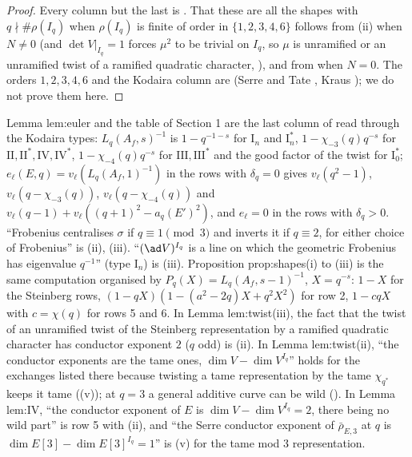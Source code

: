 \begin{proof}
Every column but the last is . That these are all the shapes with $q\nmid\#\rho(I_q)$
when $\rho(I_q)$ is finite of order in $\{1,2,3,4,6\}$ follows from (ii) when $N\ne0$ (and $\det V|_{I_q}=1$ forces $\mu^2$ to be trivial on
$I_q$, so $\mu$ is unramified or an unramified twist of a ramified quadratic character, ), and from  when $N=0$. The orders $1,2,3,4,6$ and the Kodaira column are
 (Serre and Tate \cite{SerreTate68}, Kraus \cite{Kraus90}); we do not prove them here.
\end{proof}

\begin{paperlink}\label{pl:local:euler}
Lemma lem:euler and the table of Section 1 are the last column of  read through the Kodaira types: $L_q(A_f,s)^{-1}$ is $1-q^{-1-s}$ for
$\mathrm{I}_n$ and $\mathrm{I}_n^*$, $1-\chi_{-3}(q)q^{-s}$ for $\mathrm{II},\mathrm{II}^*,\mathrm{IV},\mathrm{IV}^*$, $1-\chi_{-4}(q)q^{-s}$ for $\mathrm{III},\mathrm{III}^*$ and the good
factor of the twist for $\mathrm{I}_0^*$; $e_\ell(E,q)=v_\ell(L_q(A_f,1)^{-1})$ in the rows with $\delta_q=0$ gives $v_\ell(q^2-1)$, $v_\ell(q-\chi_{-3}(q))$, $v_\ell(q-\chi_{-4}(q))$ and
$v_\ell(q-1)+v_\ell((q+1)^2-a_q(E')^2)$, and $e_\ell=0$ in the rows with $\delta_q>0$. ``Frobenius centralises $\sigma$ if $q\equiv1\pmod3$ and inverts it if $q\equiv2$, for
either choice of Frobenius'' is (ii), (iii). ``$(\ad V)^{I_q}$ is a line on which the geometric Frobenius has eigenvalue $q^{-1}$''
(type $\mathrm{I}_n$) is (iii). Proposition prop:shapes(i) to (iii) is the same computation organised by $P_q(X)=L_q(A_f,s-1)^{-1}$,
$X=q^{-s}$: $1-X$ for the Steinberg rows, $(1-qX)(1-(a^2-2q)X+q^2X^2)$ for row 2, $1-cqX$ with $c=\chi(q)$ for rows 5 and 6. In Lemma lem:twist(iii), the fact that the twist of an
unramified twist of the Steinberg representation by a ramified quadratic character has conductor exponent $2$ ($q$ odd) is
(ii). In Lemma lem:twist(ii), ``the conductor exponents are the tame ones, $\dim V-\dim V^{I_q}$'' holds for the exchanges listed there
because twisting a tame representation by the tame $\chi_{q^*}$ keeps it tame ((v)); at $q=3$ a general additive curve can be
wild (). In Lemma lem:IV, ``the conductor exponent of $E$ is $\dim V-\dim V^{I_q}=2$, there being no wild part'' is row 5 with
(ii), and ``the Serre conductor exponent of $\bar\rho_{E,3}$ at $q$ is $\dim E[3]-\dim E[3]^{I_q}=1$'' is (v) for the tame
mod $3$ representation.
\end{paperlink}


